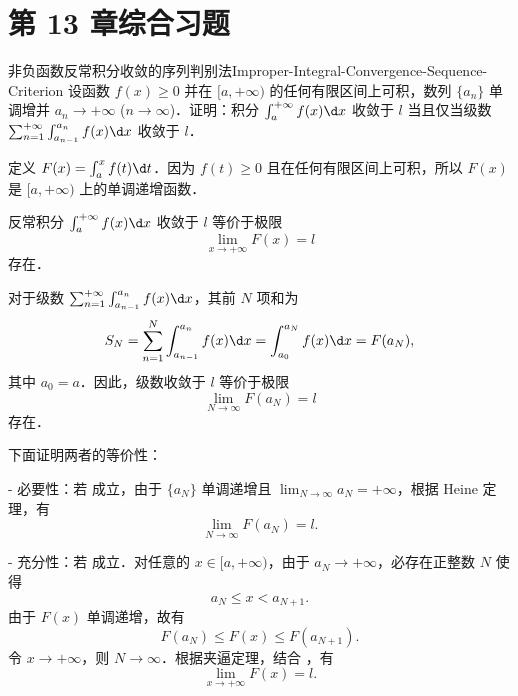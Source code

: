 \section{第 13 章综合习题}

\begin{problem}{非负函数反常积分收敛的序列判别法}{Improper-Integral-Convergence-Sequence-Criterion}
    设函数 $f(x) \geqslant 0$ 并在 $[a,+\infty)$ 的任何有限区间上可积，数列 $\{a_n\}$ 单调增并 $a_n \to +\infty$ ($n \to \infty$)．证明：积分 $\int_a^{+\infty} f(x) \d x$ 收敛于 $l$ 当且仅当级数 $\sum_{n=1}^{+\infty} \int_{a_{n-1}}^{a_n} f(x) \d x$ 收敛于 $l$．
\end{problem}

\begin{myproof}
    定义 $F(x) = \int_a^x f(t) \d t$．因为 $f(t) \geqslant 0$ 且在任何有限区间上可积，所以 $F(x)$ 是 $[a, +\infty)$ 上的单调递增函数．

    反常积分 $\int_a^{+\infty} f(x) \d x$ 收敛于 $l$ 等价于极限
    \begin{equation}\label{eq:integral-limit-1}
        \lim_{x \to +\infty} F(x) = l
    \end{equation}
    存在．

    对于级数 $\sum_{n=1}^{+\infty} \int_{a_{n-1}}^{a_n} f(x) \d x$，其前 $N$ 项和为
    \begin{equation}\label{eq:partial-sum-2}
        S_N = \sum_{n=1}^N \int_{a_{n-1}}^{a_n} f(x) \d x = \int_{a_0}^{a_N} f(x) \d x = F(a_N),
    \end{equation}
    其中 $a_0 = a$．因此，级数收敛于 $l$ 等价于极限
    \begin{equation}\label{eq:series-limit-3}
        \lim_{N \to \infty} F(a_N) = l
    \end{equation}
    存在．

    下面证明两者的等价性：

    - 必要性：若  成立，由于 $\{a_N\}$ 单调递增且 $\lim_{N \to \infty} a_N = +\infty$，根据 Heine 定理，有
    \begin{equation}\label{eq:heine-4}
        \lim_{N \to \infty} F(a_N) = l.
    \end{equation}

    - 充分性：若  成立．对任意的 $x \in [a, +\infty)$，由于 $a_N \to +\infty$，必存在正整数 $N$ 使得
    \begin{equation}\label{eq:squeeze-5}
        a_N \leqslant x < a_{N+1}.
    \end{equation}
    由于 $F(x)$ 单调递增，故有
    \begin{equation}\label{eq:squeeze-6}
        F(a_N) \leqslant F(x) \leqslant F(a_{N+1}).
    \end{equation}
    令 $x \to +\infty$，则 $N \to \infty$．根据夹逼定理，结合 ，有
    \begin{equation}\label{eq:squeeze-7}
        \lim_{x \to +\infty} F(x) = l.
    \end{equation}
\end{myproof}


